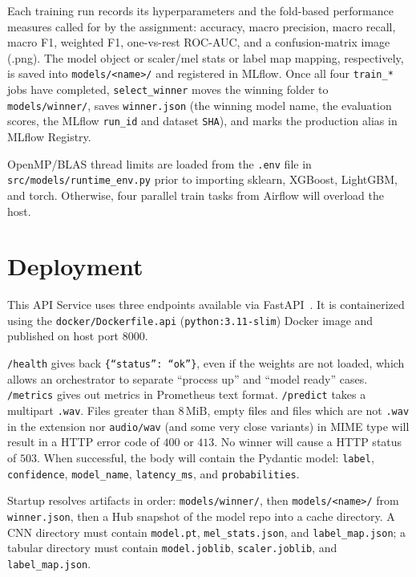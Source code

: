 \documentclass[conference]{IEEEtran}
\begin{document}
Each training run records its hyperparameters and the fold-based performance measures called for by the assignment: accuracy, macro precision, macro recall, macro F1, weighted F1, one-vs-rest ROC-AUC, and a confusion-matrix image (.png).
The model object or scaler/mel stats or label map mapping, respectively, is saved into \texttt{models/<name>/} and registered in MLflow.
Once all four \texttt{train\_*} jobs have completed, \texttt{select\_winner} moves the winning folder to \texttt{models/winner/}, saves \texttt{winner.json} (the winning model name, the evaluation scores, the MLflow \texttt{run\_id} and dataset \texttt{SHA}), and marks the production alias in MLflow Registry.

OpenMP/BLAS thread limits are loaded from the \texttt{.env} file in \texttt{src/models/runtime\_env.py} prior to importing sklearn, XGBoost, LightGBM, and torch.
Otherwise, four parallel train tasks from Airflow will overload the host.

\section{Deployment}
\label{sec:deploy}
This API Service uses three endpoints available via FastAPI~\cite{fastapi}. It is containerized using the \texttt{docker/Dockerfile.api} (\texttt{python:3.11-slim}) Docker image and published on host port \(8000\).

\texttt{/health} gives back \texttt{\{``status'': ``ok''\}}, even if the weights are not loaded, which allows an orchestrator to separate ``process up'' and ``model ready'' cases.
\texttt{/metrics} gives out metrics in Prometheus text format.
\texttt{/predict} takes a multipart \texttt{.wav}.
Files greater than \(8\,\mathrm{MiB}\), empty files and files which are not \texttt{.wav} in the extension nor \texttt{audio/wav} (and some very close variants) in MIME type will result in a HTTP error code of \(400\) or \(413\).
No winner will cause a HTTP status of \(503\).
When successful, the body will contain the Pydantic model: \texttt{label}, \texttt{confidence}, \texttt{model\_name}, \texttt{latency\_ms}, and \texttt{probabilities}.

Startup resolves artifacts in order: \texttt{models/winner/}, then \texttt{models/<name>/} from \texttt{winner.json}, then a Hub snapshot of the model repo into a cache directory.
A CNN directory must contain \texttt{model.pt}, \texttt{mel\_stats.json}, and \texttt{label\_map.json}; a tabular directory must contain \texttt{model.joblib}, \texttt{scaler.joblib}, and \texttt{label\_map.json}.
\end{document}
